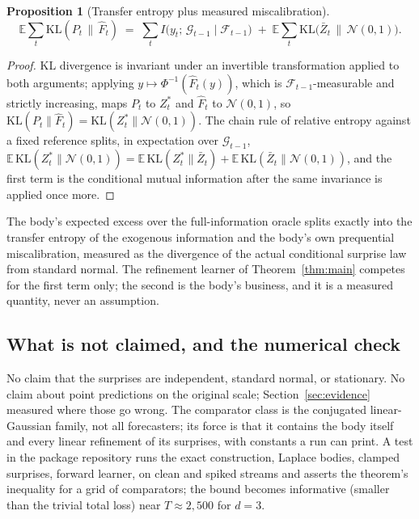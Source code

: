 \documentclass[article]{jss}
\newtheorem{proposition}{Proposition}
\theoremstyle{remark}
\newcommand{\E}{\mathbb{E}}
\newcommand{\KL}{\mathrm{KL}}
\begin{document}
\begin{proposition}[Transfer entropy plus measured miscalibration]
\label{prop:decomp}
\[
\E \sum_t \KL(P_t \,\|\, \hat F_t) \;=\; \sum_t I\big(y_t;\, \mathcal G_{t-1}
\mid \mathcal F_{t-1}\big) \;+\; \E \sum_t \KL\big(\bar Z_t \,\|\, \mathcal
N(0,1)\big).
\]
\end{proposition}

\begin{proof}
KL divergence is invariant under an invertible transformation applied to both
arguments; applying $y \mapsto \Phi^{-1}(\hat F_t(y))$, which is $\mathcal
F_{t-1}$-measurable and strictly increasing, maps $P_t$ to $Z_t^*$ and $\hat
F_t$ to $\mathcal N(0,1)$, so $\KL(P_t \| \hat F_t) = \KL(Z_t^* \| \mathcal
N(0,1))$. The chain rule of relative entropy against a fixed reference
splits, in expectation over $\mathcal G_{t-1}$, $\E\,\KL(Z_t^* \| \mathcal
N(0,1)) = \E\,\KL(Z_t^* \| \bar Z_t) + \E\,\KL(\bar Z_t \| \mathcal N(0,1))$,
and the first term is the conditional mutual information after the same
invariance is applied once more.
\end{proof}

The body's expected excess over the full-information oracle splits exactly
into the transfer entropy of the exogenous information and the body's own
prequential miscalibration, measured as the divergence of the actual
conditional surprise law from standard normal. The refinement learner of
Theorem~\ref{thm:main} competes for the first term only; the second is the
body's business, and it is a measured quantity, never an assumption.

\subsection{What is not claimed, and the numerical check}

No claim that the surprises are independent, standard normal, or stationary.
No claim about point predictions on the original scale;
Section~\ref{sec:evidence} measured where those go wrong. The comparator
class is the conjugated linear-Gaussian family, not all forecasters; its
force is that it contains the body itself and every linear refinement of its
surprises, with constants a run can print. A test in the package repository
runs the exact construction, Laplace bodies, clamped surprises, forward
learner, on clean and spiked streams and asserts the theorem's inequality for
a grid of comparators; the bound becomes informative (smaller than the
trivial total loss) near $T \approx 2{,}500$ for $d = 3$.
\end{document}
